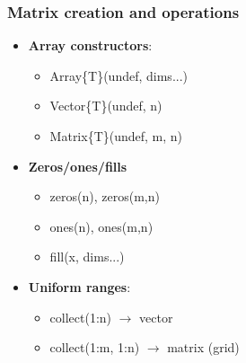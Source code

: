 \documentclass{report}
\begin{document}
    \subsubsection{Matrix creation and operations}
    \begin{itemize}
        \item \textbf{Array constructors}:
            \begin{itemize}
                \item Array\{T\}(undef, dims...)
                \item Vector\{T\}(undef, n)
                \item Matrix\{T\}(undef, m, n)
            \end{itemize}
        \item \textbf{Zeros/ones/fills}
            \begin{itemize}
                \item zeros(n), zeros(m,n)
                \item ones(n), ones(m,n)
                \item fill(x, dims...)
            \end{itemize}
        \item \textbf{Uniform ranges}:
            \begin{itemize}
                \item collect(1:n) $\to$ vector
                \item collect(1:m, 1:n) $\to$ matrix (grid)
            \end{itemize}
    \end{itemize}

    
\end{document}
